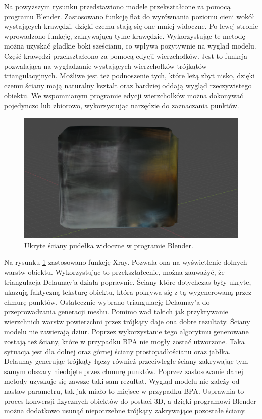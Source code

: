 Na powyższym rysunku przedstawiono modele przekształcone za pomocą programu Blender. Zastosowano funkcję flat do wyrównania poziomu cieni wokół wystających krawędzi, dzięki czemu stają się one mniej widoczne. Po lewej stronie wprowadzono funkcję, zakrywającą tylne krawędzie. Wykorzystując te metodę można uzyskać gładkie boki sześcianu, co wpływa pozytywnie na wygląd modelu. Część krawędzi przekształcono za pomocą edycji wierzchołków. Jest to funkcja pozwalająca na wygładzanie wystających wierzchołków trójkątów triangulacyjnych. Możliwe jest też podnoszenie tych, które leżą zbyt nisko, dzięki czemu ściany mają naturalny kształt oraz bardziej oddają wygląd rzeczywistego obiektu. We wspomnianym programie edycji wierzchołków można dokonywać pojedynczo lub zbiorowo, wykorzystując narzędzie do zaznaczania punktów.
\begin{figure}[H]
  \centering
  \includegraphics[scale=0.16]{delaBlendBoxXray.png}
  \caption{Ukryte ściany pudełka widoczne w programie Blender.}   
  \label{fig:pytcytpic}
\end{figure}
Na rysunku \ref{fig:pytcytpic} zastosowano funkcję Xray. Pozwala ona na wyświetlenie dolnych warstw obiektu. Wykorzystując to przekształcenie, można zauważyć, że triangulacja Delaunay'a działa poprawnie. Ściany które dotychczas były ukryte, ukazują faktyczną teksturę obiektu, która pokrywa się z tą wygenerowaną przez chmurę punktów.
\newline \indent Ostatecznie wybrano triangulację Delaunay'a do przeprowadzania generacji meshu. Pomimo wad takich jak przykrywanie wierzchnich warstw powierzchni przez trójkąty daje ona dobre rezultaty. Ściany modelu nie zawierają dziur. Poprzez wykorzystanie tego algorytmu generowane zostają też ściany, które w przypadku BPA nie mogły zostać utworzone. Taka sytuacja jest dla dolnej oraz górnej ściany prostopadłościanu oraz jabłka. Delaunay generując trójkąty łączy również przeciwległe ściany zakrywając tym samym obszary nieobjęte przez chmurę punktów. Poprzez zastosowanie danej metody uzyskuje się zawsze taki sam rezultat. Wygląd modelu nie zależy od nastaw parametru, tak jak miało to miejsce w przypadku BPA. Usprawnia to proces konwersji fizycznych obiektów do postaci 3D, a dzięki programowi Blender można dodatkowo usunąć niepotrzebne trójkąty zakrywające pozostałe ściany.
\newpage




